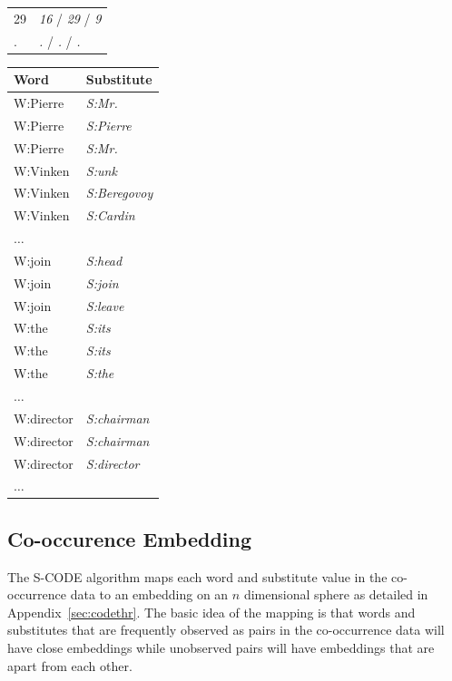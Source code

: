 \begin{table}[ht]
\begin{tabular}{|ll|}
29 & \textit{16} /  \textit{29} / \textit{9}\\
. & \textit{.}  / \textit{.} / \textit{.}\\
\hline
\end{tabular}
\quad
\begin{tabular}{|ll|}
\hline
\textbf{Word} & \textbf{Substitute}\\
\hline
W:Pierre & \textit{S:Mr.}\\
W:Pierre & \textit{S:Pierre}\\
W:Pierre & \textit{S:Mr.}\\
W:Vinken & \textit{S:unk}\\
W:Vinken & \textit{S:Beregovoy}\\
W:Vinken & \textit{S:Cardin}\\
$\hdots$&\\
W:join & \textit{S:head}\\
W:join & \textit{S:join}\\
W:join & \textit{S:leave}\\
W:the & \textit{S:its}\\
W:the & \textit{S:its}\\
W:the & \textit{S:the}\\
$\hdots$&\\
W:director & \textit{S:chairman}\\
W:director & \textit{S:chairman}\\
W:director & \textit{S:director}\\
$\hdots$&\\
\hline
\end{tabular}
\label{tab:samples}
\end{table}

\subsection{Co-occurence Embedding}

The S-CODE algorithm maps each word and substitute value in the
co-occurrence data to an embedding on an $n$ dimensional sphere as
detailed in Appendix~\ref{sec:codethr}.  The basic idea of the mapping
is that words and substitutes that are frequently observed as pairs in
the co-occurrence data will have close embeddings while unobserved
pairs will have embeddings that are apart from each other.

